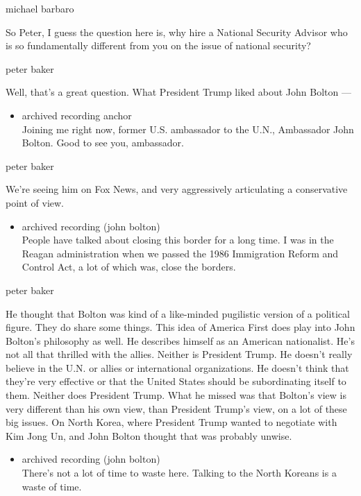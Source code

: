 michael barbaro

So Peter, I guess the question here is, why hire a National Security
Advisor who is so fundamentally different from you on the issue of
national security?

peter baker

Well, that's a great question. What President Trump liked about John
Bolton ---

\begin{itemize}
\tightlist
\item
  archived recording anchor\\
  Joining me right now, former U.S. ambassador to the U.N., Ambassador
  John Bolton. Good to see you, ambassador.
\end{itemize}

peter baker

We're seeing him on Fox News, and very aggressively articulating a
conservative point of view.

\begin{itemize}
\tightlist
\item
  archived recording (john bolton)\\
  People have talked about closing this border for a long time. I was in
  the Reagan administration when we passed the 1986 Immigration Reform
  and Control Act, a lot of which was, close the borders.
\end{itemize}

peter baker

He thought that Bolton was kind of a like-minded pugilistic version of a
political figure. They do share some things. This idea of America First
does play into John Bolton's philosophy as well. He describes himself as
an American nationalist. He's not all that thrilled with the allies.
Neither is President Trump. He doesn't really believe in the U.N. or
allies or international organizations. He doesn't think that they're
very effective or that the United States should be subordinating itself
to them. Neither does President Trump. What he missed was that Bolton's
view is very different than his own view, than President Trump's view,
on a lot of these big issues. On North Korea, where President Trump
wanted to negotiate with Kim Jong Un, and John Bolton thought that was
probably unwise.

\begin{itemize}
\tightlist
\item
  archived recording (john bolton)\\
  There's not a lot of time to waste here. Talking to the North Koreans
  is a waste of time.
\end{itemize}

